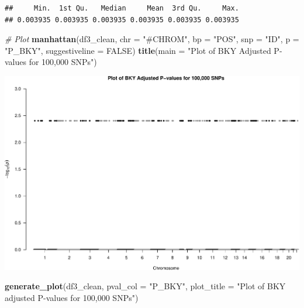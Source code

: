 \documentclass[
  12pt,
]{article}
\newenvironment{Shaded}{\begin{snugshade}}{\end{snugshade}}
\newcommand{\AttributeTok}[1]{\textcolor[rgb]{0.13,0.29,0.53}{#1}}
\newcommand{\CommentTok}[1]{\textcolor[rgb]{0.56,0.35,0.01}{\textit{#1}}}
\newcommand{\ConstantTok}[1]{\textcolor[rgb]{0.56,0.35,0.01}{#1}}
\newcommand{\FunctionTok}[1]{\textcolor[rgb]{0.13,0.29,0.53}{\textbf{#1}}}
\newcommand{\NormalTok}[1]{#1}
\newcommand{\StringTok}[1]{\textcolor[rgb]{0.31,0.60,0.02}{#1}}
\begin{document}
\begin{verbatim}
##     Min.  1st Qu.   Median     Mean  3rd Qu.     Max. 
## 0.003935 0.003935 0.003935 0.003935 0.003935 0.003935
\end{verbatim}

\begin{Shaded}
\begin{Highlighting}[]
\CommentTok{\# Plot}
\FunctionTok{manhattan}\NormalTok{(df3\_clean, }\AttributeTok{chr =} \StringTok{"\#CHROM"}\NormalTok{, }\AttributeTok{bp =} \StringTok{"POS"}\NormalTok{, }\AttributeTok{snp =} \StringTok{"ID"}\NormalTok{, }\AttributeTok{p =} \StringTok{"P\_BKY"}\NormalTok{,}
          \AttributeTok{suggestiveline =} \ConstantTok{FALSE}\NormalTok{)}
\FunctionTok{title}\NormalTok{(}\AttributeTok{main =} \StringTok{"Plot of BKY Adjusted P{-}values for 100,000 SNPs"}\NormalTok{)}
\end{Highlighting}
\end{Shaded}

\includegraphics{Arkesh_Das_CMSE_410_Semester_Project_files/figure-latex/BKY implementation-1.pdf}

\begin{Shaded}
\begin{Highlighting}[]
\FunctionTok{generate\_plot}\NormalTok{(df3\_clean, }\AttributeTok{pval\_col =} \StringTok{"P\_BKY"}\NormalTok{, }\AttributeTok{plot\_title =} \StringTok{"Plot of BKY adjusted P{-}values for 100,000 SNPs"}\NormalTok{)}
\end{Highlighting}
\end{Shaded}
\end{document}
